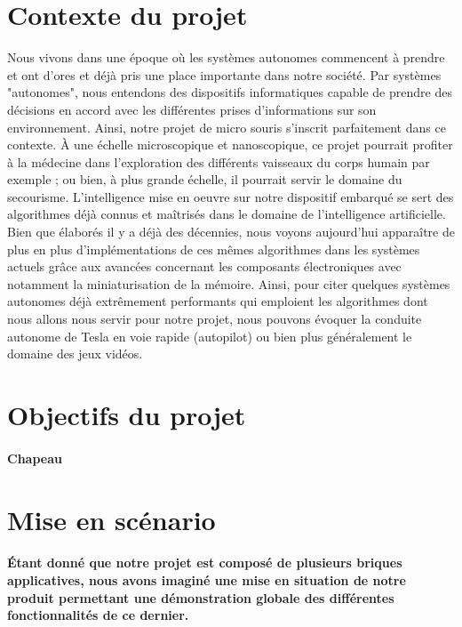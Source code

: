 \section{Contexte du projet} \label{sec:introduction}
   Nous vivons dans une époque où les systèmes autonomes commencent à 
prendre et ont d'ores et déjà pris une place importante dans notre 
société. Par systèmes "autonomes", nous entendons des dispositifs 
informatiques capable de prendre des décisions en accord avec les 
différentes prises d'informations sur son environnement. Ainsi, notre 
projet de micro souris s'inscrit parfaitement dans ce contexte.  À une 
échelle microscopique et nanoscopique, ce projet pourrait profiter à la 
médecine dans l'exploration des différents vaisseaux du corps humain par 
exemple ; ou bien, à plus grande échelle, il pourrait servir le domaine du 
secourisme. L'intelligence mise en oeuvre sur notre dispositif embarqué se 
sert des algorithmes déjà connus et maîtrisés dans le domaine de l'intelligence 
artificielle. Bien que élaborés il y a déjà des décennies, nous voyons aujourd'hui 
apparaître de plus en plus d'implémentations de ces mêmes algorithmes dans les 
systèmes actuels grâce aux avancées concernant les composants électroniques avec 
notamment la miniaturisation de la mémoire. Ainsi, pour citer quelques systèmes 
autonomes déjà extrêmement performants qui emploient les algorithmes dont nous 
allons nous servir pour notre projet, nous pouvons évoquer la conduite autonome 
de Tesla en voie rapide (autopilot) ou bien plus généralement le domaine des jeux vidéos.


\section{Objectifs du projet} \label{sec:objectifs}
\paragraph{Chapeau}

\section{Mise en scénario} \label{sec:miseEnScenario}

\paragraph{
	Étant donné que notre projet est composé de plusieurs briques applicatives, 
nous avons imaginé une mise en situation de notre produit permettant une 
démonstration globale des différentes fonctionnalités de ce dernier.}

